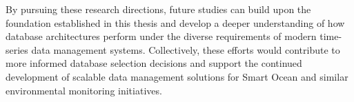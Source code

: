 By pursuing these research directions, future studies can build upon the foundation established in this thesis and develop a deeper understanding of how database architectures perform under the diverse requirements of modern time-series data management systems. Collectively, these efforts would contribute to more informed database selection decisions and support the continued development of scalable data management solutions for Smart Ocean and similar environmental monitoring initiatives.




